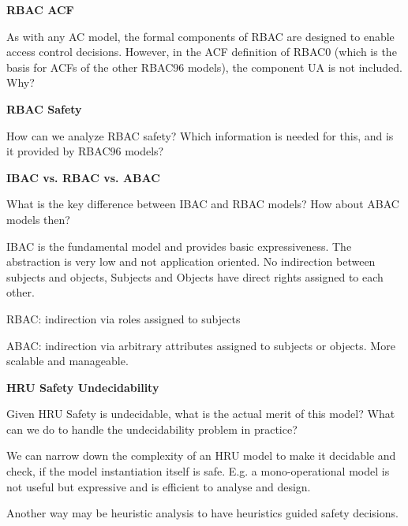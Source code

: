 \documentclass[10pt]{exam}  %
\begin{document}
\begin{questions}
    \question \textbf{RBAC ACF}\hfill

    As with any AC model, the formal components of RBAC are designed to enable access control decisions. However, in the ACF definition of RBAC0 (which is the basis for ACFs of the other RBAC96 models), the component UA is not included. Why?
    \begin{solution}
    \end{solution}

    \question \textbf{RBAC Safety}\hfill

    How can we analyze RBAC safety? Which information is needed for this, and is it provided by RBAC96 models?
    \begin{solution}
    \end{solution}

    \question \textbf{IBAC vs. RBAC vs. ABAC}\hfill

    What is the key difference between IBAC and RBAC models? How about ABAC models then?
    \begin{solution}
        IBAC is the fundamental model and provides basic expressiveness. The abstraction is very low and not application oriented. No indirection between subjects and objects, Subjects and Objects have direct rights assigned to each other.

        RBAC: indirection via roles assigned to subjects

        ABAC: indirection via arbitrary attributes assigned to subjects or objects. More scalable and manageable.
    \end{solution}

    \question \textbf{HRU Safety Undecidability}\hfill

    Given HRU Safety is undecidable, what is the actual merit of this model? What can we do to handle the undecidability problem in practice?
    \begin{solution}
        We can narrow down the complexity of an HRU model to make it decidable and check, if the model instantiation itself is safe. E.g. a mono-operational model is not useful but expressive and is efficient to analyse and design. 

        Another way may be heuristic analysis to have heuristics guided safety decisions.
    \end{solution}


\end{questions}
\end{document}
